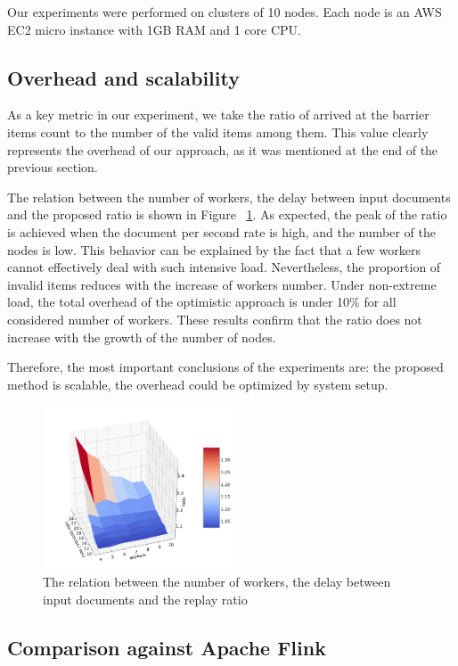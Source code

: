 Our experiments were performed on clusters of 10 nodes. Each node is an AWS EC2 micro instance with 1GB RAM and 1 core CPU.

\subsection{Overhead and scalability}

As a key metric in our experiment, we take the ratio of arrived at the barrier items count to the number of the valid items among them. This value clearly represents the overhead of our approach, as it was mentioned at the end of the previous section. 

The relation between the number of workers, the delay between input documents and the proposed ratio is shown in Figure ~\ref{experiment}. As expected, the peak of the ratio is achieved when the document per second rate is high, and the number of the nodes is low. This behavior can be explained by the fact that a few workers cannot effectively deal with such intensive load. Nevertheless, the proportion of invalid items reduces with the increase of workers number. Under non-extreme load, the total overhead of the optimistic approach is under 10\% for all considered number of workers. These results confirm that the ratio does not increase with the growth of the number of nodes.

Therefore, the most important conclusions of the experiments are: the proposed method is scalable, the overhead could be optimized by system setup.

\begin{figure}[htbp]
  \centering
  \includegraphics[width=0.5\textwidth]{pics/experiment}
  \caption{The relation between the number of workers, the delay between input documents and the replay ratio}
  \label {experiment}
\end{figure}

\subsection{Comparison against Apache Flink}

